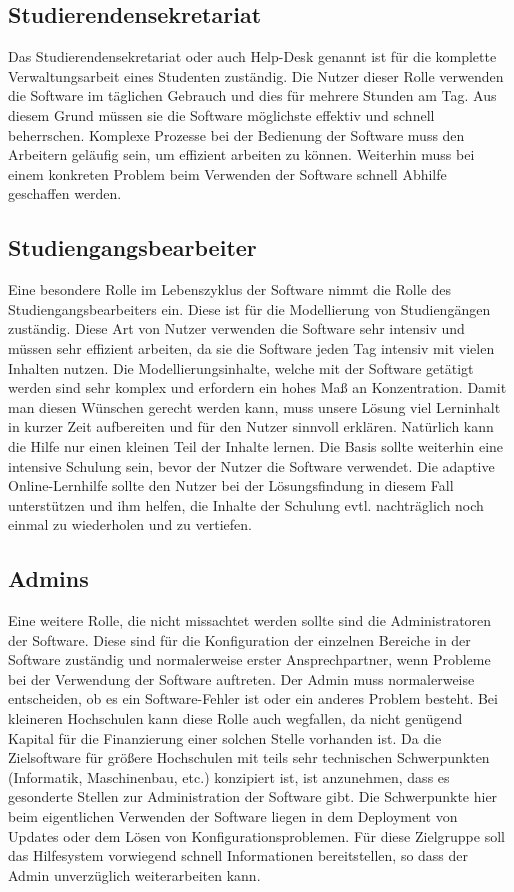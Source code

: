 \subsection{Studierendensekretariat}
Das Studierendensekretariat oder auch Help-Desk genannt ist für die komplette Verwaltungsarbeit eines Studenten zuständig. Die Nutzer dieser Rolle verwenden die Software im täglichen Gebrauch und dies für mehrere Stunden am Tag. Aus diesem Grund müssen sie die Software möglichste effektiv und schnell beherrschen. Komplexe Prozesse bei der Bedienung der Software muss den Arbeitern geläufig sein, um effizient arbeiten zu können. Weiterhin muss bei einem konkreten Problem beim Verwenden der Software schnell Abhilfe geschaffen werden. 
\subsection{Studiengangsbearbeiter}
Eine besondere Rolle im Lebenszyklus der Software nimmt die Rolle des Studiengangsbearbeiters ein. Diese ist für die Modellierung von Studiengängen zuständig. Diese Art von Nutzer verwenden die Software sehr intensiv und müssen sehr effizient arbeiten, da sie die Software jeden Tag intensiv mit vielen Inhalten nutzen. Die Modellierungsinhalte, welche mit der Software getätigt werden sind sehr komplex und erfordern ein hohes Maß an Konzentration. Damit man diesen Wünschen gerecht werden kann, muss unsere Lösung viel Lerninhalt in kurzer Zeit aufbereiten und für den Nutzer sinnvoll erklären. Natürlich kann die Hilfe nur einen kleinen Teil der Inhalte lernen. Die Basis sollte weiterhin eine intensive Schulung sein, bevor der Nutzer die Software verwendet. Die adaptive Online-Lernhilfe sollte den Nutzer bei der Lösungsfindung in diesem Fall unterstützen und ihm helfen, die Inhalte der Schulung evtl. nachträglich noch einmal zu wiederholen und zu vertiefen.

\subsection{Admins}
Eine weitere Rolle, die nicht missachtet werden sollte sind die Administratoren der Software. Diese sind für die Konfiguration der einzelnen Bereiche in der Software zuständig und normalerweise erster Ansprechpartner, wenn Probleme bei der Verwendung der Software auftreten. Der Admin muss normalerweise entscheiden, ob es ein Software-Fehler ist oder ein anderes Problem besteht. Bei kleineren Hochschulen kann diese Rolle auch wegfallen, da nicht genügend Kapital für die Finanzierung einer solchen Stelle vorhanden ist. Da die Zielsoftware für größere Hochschulen mit teils sehr technischen Schwerpunkten (Informatik, Maschinenbau, etc.) konzipiert ist, ist anzunehmen, dass es gesonderte Stellen zur Administration der Software gibt. Die Schwerpunkte hier beim eigentlichen Verwenden der Software liegen in dem Deployment von Updates oder dem Lösen von Konfigurationsproblemen. Für diese Zielgruppe soll das Hilfesystem vorwiegend schnell Informationen bereitstellen, so dass der Admin unverzüglich weiterarbeiten kann.

